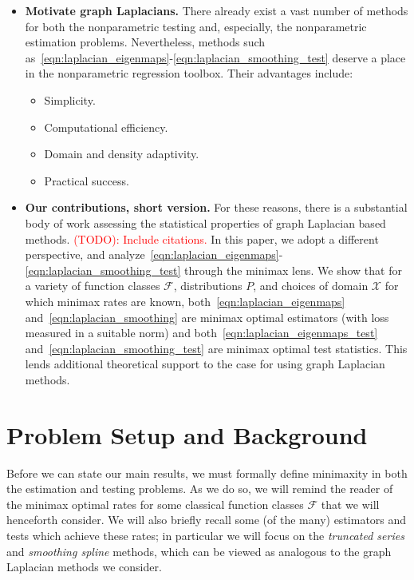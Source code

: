 \documentclass{article}
\newcommand{\1}{\mathbf{1}}
\newcommand{\mc}[1]{\mathcal{#1}}
\theoremstyle{alden}
\theoremstyle{aldenthm}
\theoremstyle{definition}
\theoremstyle{remark}
\begin{document}
\begin{itemize}
	\item \textbf{Motivate graph Laplacians.} There already exist a vast number of methods for both the nonparametric testing and, especially, the nonparametric estimation problems. Nevertheless, methods such as~\eqref{eqn:laplacian_eigenmaps}-\eqref{eqn:laplacian_smoothing_test} deserve a place in the nonparametric regression toolbox. Their advantages include:
	\begin{itemize}
		\item Simplicity.
		\item Computational efficiency.
		\item Domain and density adaptivity.
		\item Practical success.
	\end{itemize}
	\item \textbf{Our contributions, short version.} For these reasons, there is a  substantial body of work assessing the statistical properties of graph Laplacian based methods. \textcolor{red}{(TODO): Include citations.} In this paper, we adopt a different perspective, and analyze~\eqref{eqn:laplacian_eigenmaps}-\eqref{eqn:laplacian_smoothing_test} through the minimax lens. We show that for a variety of function classes $\mc{F}$, distributions $P$, and choices of domain $\mc{X}$ for which minimax rates are known, both~\eqref{eqn:laplacian_eigenmaps} and~\eqref{eqn:laplacian_smoothing} are minimax optimal estimators (with loss measured in a suitable norm) and both~\eqref{eqn:laplacian_eigenmaps_test} and~\eqref{eqn:laplacian_smoothing_test} are minimax optimal test statistics. This lends additional theoretical support to the case for using graph Laplacian methods.
\end{itemize}

\section{Problem Setup and Background}
\label{sec:problem_setup_and_background}

Before we can state our main results, we must formally define minimaxity in both the estimation and testing problems. As we do so, we will remind the reader of the minimax optimal rates for some classical function classes $\mc{F}$ that we will henceforth consider. We will also briefly recall some (of the many) estimators and tests which achieve these rates; in particular we will focus on the \emph{truncated series} and \emph{smoothing spline} methods, which can be viewed as analogous to the graph Laplacian methods we consider.
\end{document}
